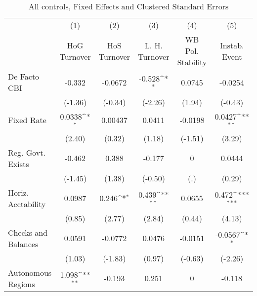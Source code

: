 \begin{table}[htbp]\centering
\def\sym#1{\ifmmode^{#1}\else\(^{#1}\)\fi}
\caption{All controls, Fixed Effects and Clustered Standard Errors \label{fullcmultIndFEDF}}
\begin{tabular}{l*{5}{c}}
\toprule
                                        &\multicolumn{1}{c}{(1)}&\multicolumn{1}{c}{(2)}&\multicolumn{1}{c}{(3)}&\multicolumn{1}{c}{(4)}&\multicolumn{1}{c}{(5)}\\
                                        &\multicolumn{1}{c}{HoG Turnover}&\multicolumn{1}{c}{HoS Turnover}&\multicolumn{1}{c}{L. H. Turnover}&\multicolumn{1}{c}{WB Pol. Stability}&\multicolumn{1}{c}{Instab. Event}\\
\midrule
De Facto CBI                            &   -0.332         &  -0.0672         &   -0.528\sym{*}  &   0.0745         &  -0.0254         \\
                                        &  (-1.36)         &  (-0.34)         &  (-2.26)         &   (1.94)         &  (-0.43)         \\
\addlinespace
Fixed Rate                              &   0.0338\sym{*}  &  0.00437         &   0.0411         &  -0.0198         &   0.0427\sym{**} \\
                                        &   (2.40)         &   (0.32)         &   (1.18)         &  (-1.51)         &   (3.29)         \\
\addlinespace
Reg. Govt. Exists                       &   -0.462         &    0.388         &   -0.177         &        0         &   0.0444         \\
                                        &  (-1.45)         &   (1.38)         &  (-0.50)         &      (.)         &   (0.29)         \\
\addlinespace
Horiz. Acctability                      &   0.0987         &    0.246\sym{*}  &    0.439\sym{**} &   0.0655         &    0.472\sym{***}\\
                                        &   (0.85)         &   (2.77)         &   (2.84)         &   (0.44)         &   (4.13)         \\
\addlinespace
Checks and Balances                     &   0.0591         &  -0.0772         &   0.0476         &  -0.0151         &  -0.0567\sym{*}  \\
                                        &   (1.03)         &  (-1.83)         &   (0.97)         &  (-0.63)         &  (-2.26)         \\
\addlinespace
Autonomous Regions                      &    1.098\sym{**} &   -0.193         &    0.251         &        0         &   -0.118         \\

\end{tabular}
\end{table}
